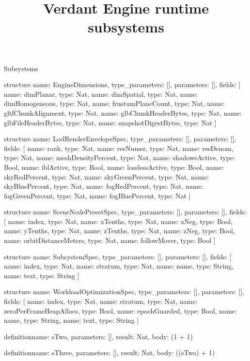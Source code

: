 \begin{lexlean}{Subsystems}
\title{Verdant Engine runtime subsystems}
\begin{semanticmodule}
structure{
  name: EngineDimensions,
  type_parameters: [],
  parameters: [],
  fields: [
    {name: dimPlanar, type: Nat},
    {name: dimSpatial, type: Nat},
    {name: dimHomogeneous, type: Nat},
    {name: frustumPlaneCount, type: Nat},
    {name: gltfChunkAlignment, type: Nat},
    {name: glbChunkHeaderBytes, type: Nat},
    {name: glbFileHeaderBytes, type: Nat},
    {name: snapshotDigestBytes, type: Nat}
  ]
}

structure{
  name: LodRenderEnvelopeSpec,
  type_parameters: [],
  parameters: [],
  fields: [
    {name: rank, type: Nat},
    {name: resNumer, type: Nat},
    {name: resDenom, type: Nat},
    {name: meshDensityPercent, type: Nat},
    {name: shadowsActive, type: Bool},
    {name: iblActive, type: Bool},
    {name: losslessActive, type: Bool},
    {name: skyRedPercent, type: Nat},
    {name: skyGreenPercent, type: Nat},
    {name: skyBluePercent, type: Nat},
    {name: fogRedPercent, type: Nat},
    {name: fogGreenPercent, type: Nat},
    {name: fogBluePercent, type: Nat}
  ]
}

structure{
  name: SceneNodePresetSpec,
  type_parameters: [],
  parameters: [],
  fields: [
    {name: index, type: Nat},
    {name: xTenths, type: Nat},
    {name: xNeg, type: Bool},
    {name: yTenths, type: Nat},
    {name: zTenths, type: Nat},
    {name: zNeg, type: Bool},
    {name: orbitDistanceMeters, type: Nat},
    {name: followMover, type: Bool}
  ]
}

structure{
  name: SubsystemSpec,
  type_parameters: [],
  parameters: [],
  fields: [
    {name: index, type: Nat},
    {name: stratum, type: Nat},
    {name: name, type: String},
    {name: text, type: String}
  ]
}

structure{
  name: WorkloadOptimizationSpec,
  type_parameters: [],
  parameters: [],
  fields: [
    {name: index, type: Nat},
    {name: stratum, type: Nat},
    {name: zeroPerFrameHeapAllocs, type: Bool},
    {name: epochGuarded, type: Bool},
    {name: name, type: String},
    {name: text, type: String}
  ]
}

definition{name: sTwo, parameters: [], result: Nat, body: (1 + 1)}

definition{name: sThree, parameters: [], result: Nat, body: ((sTwo) + 1)}


\end{semanticmodule}
\end{lexlean}
